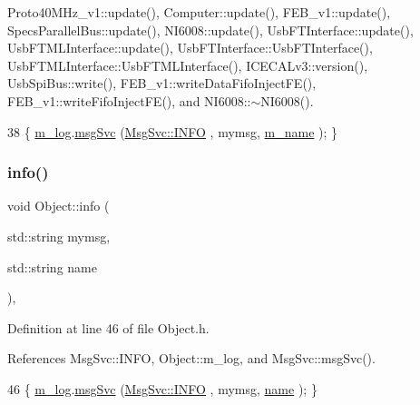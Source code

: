 Proto40\+M\+Hz\+\_\+v1\+::update(), Computer\+::update(), F\+E\+B\+\_\+v1\+::update(), Specs\+Parallel\+Bus\+::update(), N\+I6008\+::update(), Usb\+F\+T\+Interface\+::update(), Usb\+F\+T\+M\+L\+Interface\+::update(), Usb\+F\+T\+Interface\+::\+Usb\+F\+T\+Interface(), Usb\+F\+T\+M\+L\+Interface\+::\+Usb\+F\+T\+M\+L\+Interface(), I\+C\+E\+C\+A\+Lv3\+::version(), Usb\+Spi\+Bus\+::write(), F\+E\+B\+\_\+v1\+::write\+Data\+Fifo\+Inject\+F\+E(), F\+E\+B\+\_\+v1\+::write\+Fifo\+Inject\+F\+E(), and N\+I6008\+::$\sim$\+N\+I6008().


\begin{DoxyCode}
38 \{ \hyperlink{classObject_a0d269813dd7ac1f24bc143031e2963f2}{m\_log}.\hyperlink{classMsgSvc_ad25f18047920cc59a314e5098259711c}{msgSvc} (\hyperlink{classMsgSvc_ae671eb7301996cd049d2da8a65925926ad2fcf3f3e734fc41ee097cc23670ce51}{MsgSvc::INFO}    , mymsg, \hyperlink{classObject_a8b83c95c705d2c3ba0d081fe1710f48d}{m\_name} ); \}
\end{DoxyCode}
\mbox{\label{classObject_a1ca123253dfd30fc28b156f521dcbdae}} 
\subsubsection{\texorpdfstring{info()}{info()}\hspace{0.1cm}{\footnotesize\ttfamily [2/2]}}
{\footnotesize\ttfamily void Object\+::info (\begin{DoxyParamCaption}\item[{std\+::string}]{mymsg,  }\item[{std\+::string}]{name }\end{DoxyParamCaption})\hspace{0.3cm}{\ttfamily [inline]}, {\ttfamily [inherited]}}



Definition at line 46 of file Object.\+h.



References Msg\+Svc\+::\+I\+N\+FO, Object\+::m\+\_\+log, and Msg\+Svc\+::msg\+Svc().


\begin{DoxyCode}
46 \{ \hyperlink{classObject_a0d269813dd7ac1f24bc143031e2963f2}{m\_log}.\hyperlink{classMsgSvc_ad25f18047920cc59a314e5098259711c}{msgSvc} (\hyperlink{classMsgSvc_ae671eb7301996cd049d2da8a65925926ad2fcf3f3e734fc41ee097cc23670ce51}{MsgSvc::INFO}    , mymsg, \hyperlink{classObject_a300f4c05dd468c7bb8b3c968868443c1}{name} ); \}
\end{DoxyCode}
\mbox{\label{classA3PE_abe07bae8ce2f32926b7258f269ae655e}} 
